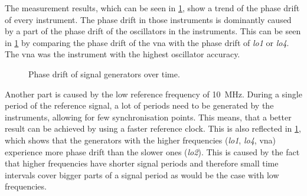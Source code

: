 \documentclass[12pt,a4paper,parskip=full,abstract=true,BCOR=12mm,twoside,open=right]{scrreprt}
\def\device#1{\textit{#1}}
\begin{document}
The measurement results, which can be seen in \cref{fig:phase_overall}, show a
trend of the phase drift of every instrument. The phase drift in those instruments is dominantly
caused by a part of the phase drift of the oscillators in the instruments. This
can be seen in \cref{fig:phase_overall} by comparing the phase drift of the \gls{vna}
with the phase drift of \device{lo1} or \device{lo4}. The \gls{vna} was the instrument
with the highest oscillator accuracy.

\begin{figure}[htb]
    \centering
    \caption{Phase drift of signal generators over time.}
    \label{fig:phase_overall}
\end{figure}

Another part is caused by
the low reference frequency of \SI{10}{\mega\hertz}. During a single period of the reference
signal, a lot of periods need to be generated by the instruments, allowing for few
synchronisation points. This means, that a better result can be achieved by using a faster
reference clock. This is also reflected in \cref{fig:phase_overall}, which shows
that the generators with the higher frequencies (\device{lo1}, \device{lo4}, \gls{vna})
experience more phase drift than the slower ones (\device{lo2}). This
is caused by the fact that higher frequencies have shorter signal periods and therefore
small time intervals cover bigger parts of a signal period as would be the case with
low frequencies.
\end{document}
